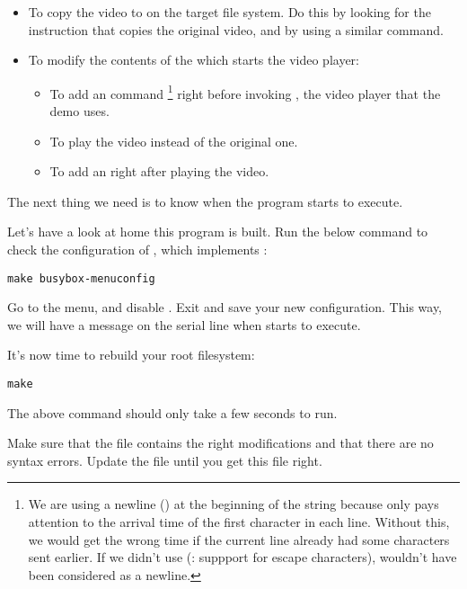 \begin{itemize}
\item To copy the  video to  on the target
      file system. Do this by looking for the instruction that copies the 
      original video, and by using a similar command.
\item To modify the contents of the  which starts the video 
      player: 
      \begin{itemize}
      \item To add an  command
	    \footnote{We are using a newline (\code{\n}) at the
beginning of the string because  only pays attention to
the arrival time of the first character in each line. Without this, we
would get the wrong time if the current line already had some
characters sent earlier. If we didn't use  (:
suppport for escape characters), \code{\n} wouldn't have been considered
as a newline.}
            right before invoking , the video player that the demo
	    uses.
      \item To play the  video instead of the original
  	    one.
      \item To add an  right after
 	    playing the video.
      \end{itemize}
\end{itemize}

The next thing we need is to know when the  program starts to
execute. 

Let's have a look at home this program is built. Run the below command
to check the configuration of , which implements
:

\begin{verbatim}
make busybox-menuconfig
\end{verbatim}

Go to the  menu, and disable . Exit and save your new configuration. This way, we will have
a message on the serial line when  starts to execute.

It's now time to rebuild your root filesystem:
\begin{verbatim}
make
\end{verbatim}

The above command should only take a few seconds to run.

Make sure that the  file
contains the right modifications and that there are no syntax errors.
Update the  file until
you get this file right.

